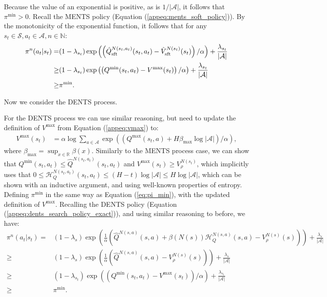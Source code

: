 \documentclass{article}
\newcommand{\bb}[1]{\mathbb{#1}}
\newcommand{\cl}[1]{\mathcal{#1}}
\newcommand{\Vst}[2]{\hat{V}^{#2}_{\textnormal{sft}}(#1)}
\newcommand{\Qst}[3]{\hat{Q}^{#3}_{\textnormal{sft}}(#1,#2)}
\newcommand{\Qt}[3]{\hat{Q}^{#3}(#1,#2)}
\theoremstyle{plain}
\newenvironment{proofoutline}{\proof[Proof outline]}{\endproof}
\begin{document}
\begin{appendices}
\begin{proofoutline}
            Because the value of an exponential is positive, as is $1/|\cl{A}|$, it follows that $\pi^{\min}>0.$ Recall the MENTS policy (Equation (\ref{appeq:ments_soft_policy})). By the monotonicity of the exponential function, it follows that for any $s_t\in\cl{S}, a_t\in\cl{A}, n\in\bb{N}$:
            \begin{align}
                \pi^{n}(a_t|s_t) 
                    =& (1-\lambda_{s_t})\exp\left(\left(\Qst{s_t}{a_t}{N(s_t,a_t)}-\Vst{s_t}{N(s_t)}\right)/\alpha\right) 
                        + \frac{\lambda_{s_t}}{|\cl{A}|} \\
                    \geq& (1-\lambda_{s_t})\exp\left(\left(Q^{\min}(s_t,a_t)-V^{\max}(s_t)\right)/\alpha\right) 
                        + \frac{\lambda_{s_t}}{|\cl{A}|} \\
                    \geq& \pi^{\min}.
            \end{align}
            
            
            
            Now we consider the DENTS process.

            For the DENTS process we can use similar reasoning, but need to update the definition of $V^{\max}$ from Equation (\ref{appeq:vmax}) to:
            \begin{align}
                V^{\max}(s_t) &= \alpha \log \sum_{a\in\cl{A}} \exp \left(\left(Q^{\max}(s_t,a) + H\beta_{\max}\log|\cl{A}| \right)/\alpha\right), 
            \end{align}
            where $\beta_{\max}=\sup_{x\in\bb{R}}\beta(x)$. Similarly to the MENTS process case, we can show that $Q^{\min}(s_t,a_t)\leq \Qt{s_t}{a_t}{N(s_t,a_t)}$ and $V^{\max}(s_t)\geq V_{\rho}^{N(s_t)}$, which implicitly uses that $0 \leq \cl{H}_Q^{N(s_t,a_t)}(s_t,a_t) \leq (H-t)\log|\cl{A}| \leq H\log|\cl{A}|$, which can be shown with an inductive argument, and using well-known properties of entropy. Defining $\pi^{\min}$ in the same way as Equation (\ref{eq:pi_min}), with the updated definition of $V^{\max}$. Recalling the DENTS policy (Equation (\ref{appeq:dents_search_policy_exact})), and using similar reasoning to before, we have:
            \begin{align}
                \pi^{n}(a_t|s_t) 
                    =& (1-\lambda_s)\exp\left(\frac{1}{\alpha}\left(\Qt{s}{a}{N(s,a)} + \beta(N(s))\cl{H}_Q^{N(s,a)}(s,a) - V_\rho^{N(s)}(s) \right)\right) + \frac{\lambda_s}{|\cl{A}|} \\
                    \geq& (1-\lambda_s)\exp\left(\frac{1}{\alpha}\left(\Qt{s}{a}{N(s,a)} - V_\rho^{N(s)}(s) \right)\right) + \frac{\lambda_s}{|\cl{A}|} \\
                    \geq& (1-\lambda_{s_t})\exp\left(\left(Q^{\min}(s_t,a_t)-V^{\max}(s_t)\right)/\alpha\right) 
                        + \frac{\lambda_{s_t}}{|\cl{A}|} \\
                    \geq& \pi^{\min}.
            \end{align}
        \end{proofoutline}
    

\end{appendices}
\end{document}
